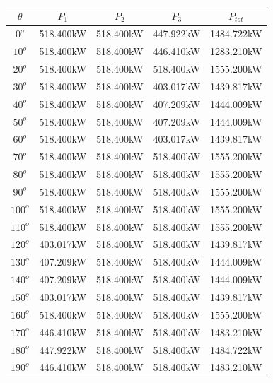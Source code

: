 	\singlespacing
	\begin{table}[H]
	    \centering
	    \begin{tabular}{|c|c|c|c|c|}
	         \hline
	         $\theta$ & $P_{1}$ & $P_{2}$ & $P_{3}$ & $P_{tot}$ \\
	     \hline
	     $0^{o}$ & 518.400kW & 518.400kW & 447.922kW & 1484.722kW \\
	     \hline
	     $10^{o}$ & 518.400kW & 518.400kW & 446.410kW & 1283.210kW \\
	     \hline
	     $20^{o}$ & 518.400kW & 518.400kW & 518.400kW & 1555.200kW \\
	     \hline
	     $30^{o}$ & 518.400kW & 518.400kW & 403.017kW & 1439.817kW \\
	     \hline
	     $40^{o}$ & 518.400kW & 518.400kW & 407.209kW & 1444.009kW \\
	     \hline
	     $50^{o}$ & 518.400kW & 518.400kW & 407.209kW & 1444.009kW \\
	     \hline
	     $60^{o}$ & 518.400kW & 518.400kW & 403.017kW & 1439.817kW \\
	     \hline
	     $70^{o}$ & 518.400kW & 518.400kW & 518.400kW & 1555.200kW \\
	     \hline
	     $80^{o}$ & 518.400kW & 518.400kW & 518.400kW & 1555.200kW \\
	     \hline
	     $90^{o}$ & 518.400kW & 518.400kW & 518.400kW & 1555.200kW \\
	     \hline
	     $100^{o}$ & 518.400kW & 518.400kW & 518.400kW & 1555.200kW \\
	     \hline
	     $110^{o}$ & 518.400kW & 518.400kW & 518.400kW & 1555.200kW \\
	     \hline
	     $120^{o}$ & 403.017kW & 518.400kW & 518.400kW & 1439.817kW \\
	     \hline
	     $130^{o}$ & 407.209kW & 518.400kW & 518.400kW & 1444.009kW \\
	     \hline
	     $140^{o}$ & 407.209kW & 518.400kW & 518.400kW & 1444.009kW \\
	     \hline
	     $150^{o}$ & 403.017kW & 518.400kW & 518.400kW & 1439.817kW \\
	     \hline
	     $160^{o}$ & 518.400kW & 518.400kW & 518.400kW & 1555.200kW \\
	     \hline
	     $170^{o}$ & 446.410kW & 518.400kW & 518.400kW & 1483.210kW \\
	     \hline
	     $180^{o}$ & 447.922kW & 518.400kW & 518.400kW & 1484.722kW \\
	     \hline
	     $190^{o}$ & 446.410kW & 518.400kW & 518.400kW & 1483.210kW \\

\end{tabular}
\end{table}
